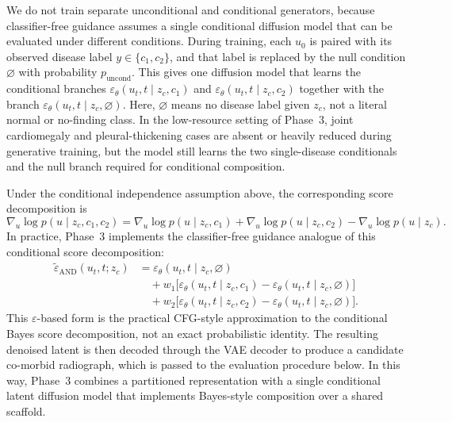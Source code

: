 We do not train separate unconditional and conditional generators, because classifier-free guidance assumes a single conditional diffusion model that can be evaluated under different conditions. 
During training, each \(u_0\) is paired with its observed disease label \(y \in \{c_1,c_2\}\), and that label is replaced by the null condition \(\varnothing\) with probability \(p_{\mathrm{uncond}}\). 
This gives one diffusion model that learns the conditional branches \(\varepsilon_\theta(u_t,t \mid z_c,c_1)\) and \(\varepsilon_\theta(u_t,t \mid z_c,c_2)\) together with the branch \(\varepsilon_\theta(u_t,t \mid z_c,\varnothing)\). 
Here, \(\varnothing\) means no disease label given \(z_c\), not a literal normal or no-finding class. 
In the low-resource setting of Phase~3, joint cardiomegaly and pleural-thickening cases are absent or heavily reduced during generative training, but the model still learns the two single-disease conditionals and the null branch required for conditional composition.

Under the conditional independence assumption above, the corresponding score decomposition is
\begin{equation}
    \nabla_u \log p(u \mid z_c, c_1, c_2)
    =
    \nabla_u \log p(u \mid z_c, c_1)
    +
    \nabla_u \log p(u \mid z_c, c_2)
    -
    \nabla_u \log p(u \mid z_c).
\end{equation}
In practice, Phase~3 implements the classifier-free guidance analogue of this conditional score decomposition:
\begin{equation}
\begin{aligned}
    \tilde\varepsilon_{\mathrm{AND}}(u_t,t; z_c)
    &=
    \varepsilon_\theta(u_t,t \mid z_c,\varnothing) \\
    &\quad+
    w_1\bigl[
        \varepsilon_\theta(u_t,t \mid z_c,c_1)
        -
        \varepsilon_\theta(u_t,t \mid z_c,\varnothing)
    \bigr] \\
    &\quad+
    w_2\bigl[
        \varepsilon_\theta(u_t,t \mid z_c,c_2)
        -
        \varepsilon_\theta(u_t,t \mid z_c,\varnothing)
    \bigr].
\end{aligned}
\end{equation}
This \(\varepsilon\)-based form is the practical CFG-style approximation to the conditional Bayes score decomposition, not an exact probabilistic identity. The resulting denoised latent is then decoded through the VAE decoder to produce a candidate co-morbid radiograph, which is passed to the evaluation procedure below. In this way, Phase~3 combines a partitioned representation with a single conditional latent diffusion model that implements Bayes-style composition over a shared scaffold.


